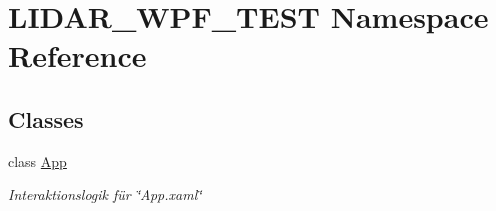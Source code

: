 \hypertarget{namespace_l_i_d_a_r___w_p_f___t_e_s_t}{}\section{L\+I\+D\+A\+R\+\_\+\+W\+P\+F\+\_\+\+T\+E\+ST Namespace Reference}
\label{namespace_l_i_d_a_r___w_p_f___t_e_s_t}
\subsection*{Classes}
\begin{DoxyCompactItemize}
\item 
class \hyperlink{class_l_i_d_a_r___w_p_f___t_e_s_t_1_1_app}{App}
\begin{DoxyCompactList}\small\item\em Interaktionslogik für \char`\"{}\+App.\+xaml\char`\"{} \end{DoxyCompactList}\end{DoxyCompactItemize}
